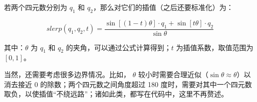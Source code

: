 \documentclass[a4paper, 12pt]{article}
\begin{document}
\begin{itemize}[leftmargin=2em, label={}]
若两个四元数分别为 $q_1$ 和 $q_2$，那么对它们的插值（之后还要标准化）为：

$$
slerp(q_1, q_2, t) = \frac{\sin [(1-t)\theta] \cdot q_1 + \sin [t\theta]\cdot q_2}{\sin \theta}
$$

其中：$\theta$ 为 $q_1$ 和 $q_2$ 的夹角，可以通过公式计算得到；$t$ 为插值系数，取值范围为 $[0,1]$。

当然，还需要考虑很多边界情况。比如， $\theta$ 较小时需要合理近似（$\sin \theta \approx \theta$）以消去接近 0 的除数；两个四元数之间角度超过 180 度时，需要对其中一个四元数取负，以使插值“不绕远路”；诸如此类，都写在代码中，这里不再赘述。



\end{itemize}
\end{document}
